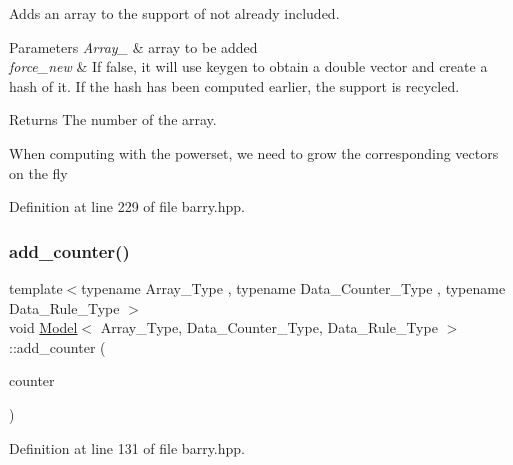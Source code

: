 Adds an array to the support of not already included. 


\begin{DoxyParams}{Parameters}
{\em Array\+\_\+} & array to be added \\
\hline
{\em force\+\_\+new} & If {\ttfamily false}, it will use {\ttfamily keygen} to obtain a double vector and create a hash of it. If the hash has been computed earlier, the support is recycled.\\
\hline
\end{DoxyParams}
\begin{DoxyReturn}{Returns}
The number of the array. 
\end{DoxyReturn}
When computing with the powerset, we need to grow the corresponding vectors on the fly 

Definition at line 229 of file barry.\+hpp.

\mbox{\label{classbarry_1_1_model_a1548bd4681944c3eb761a22a38ef5547}} 
\subsubsection{\texorpdfstring{add\+\_\+counter()}{add\_counter()}\hspace{0.1cm}{\footnotesize\ttfamily [1/3]}}
{\footnotesize\ttfamily template$<$typename Array\+\_\+\+Type , typename Data\+\_\+\+Counter\+\_\+\+Type , typename Data\+\_\+\+Rule\+\_\+\+Type $>$ \\
void \hyperlink{classbarry_1_1_model}{Model}$<$ Array\+\_\+\+Type, Data\+\_\+\+Counter\+\_\+\+Type, Data\+\_\+\+Rule\+\_\+\+Type $>$\+::add\+\_\+counter (\begin{DoxyParamCaption}\item[{\hyperlink{classbarry_1_1_counter}{Counter}$<$ Array\+\_\+\+Type, Data\+\_\+\+Counter\+\_\+\+Type $>$ \&}]{counter }\end{DoxyParamCaption})\hspace{0.3cm}{\ttfamily [inline]}}



Definition at line 131 of file barry.\+hpp.

\mbox{\label{classbarry_1_1_model_a6c1f524daf08e10888a49318030616c4}} 

